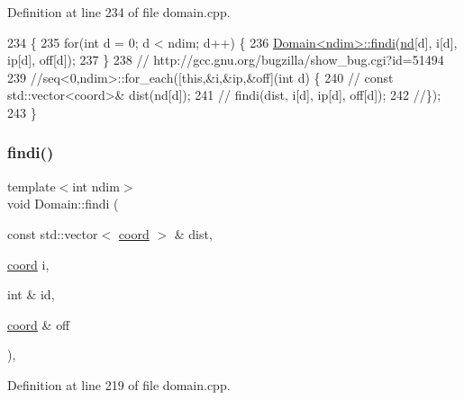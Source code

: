 Definition at line 234 of file domain.\+cpp.


\begin{DoxyCode}
234                                                                             \{
235     \textcolor{keywordflow}{for}(\textcolor{keywordtype}{int} d = 0; d < ndim; d++) \{
236         \hyperlink{classshark_1_1ndim_1_1_domain_a54d58b320fe6d558735b60753f30f7f4}{Domain<ndim>::findi}(\hyperlink{classshark_1_1ndim_1_1_domain_a4964336cc4ccdb2bfcc616fdcbb9a570}{nd}[d], i[d], ip[d], off[d]);
237     \}
238     \textcolor{comment}{// http://gcc.gnu.org/bugzilla/show\_bug.cgi?id=51494}
239     \textcolor{comment}{//seq<0,ndim>::for\_each([this,&i,&ip,&off](int d) \{}
240     \textcolor{comment}{//  const std::vector<coord>& dist(nd[d]);}
241     \textcolor{comment}{//  findi(dist, i[d], ip[d], off[d]);}
242     \textcolor{comment}{//\});}
243 \}
\end{DoxyCode}
\hypertarget{classshark_1_1ndim_1_1_domain_a54d58b320fe6d558735b60753f30f7f4}{}\label{classshark_1_1ndim_1_1_domain_a54d58b320fe6d558735b60753f30f7f4} 
\subsubsection{\texorpdfstring{findi()}{findi()}}
{\footnotesize\ttfamily template$<$int ndim$>$ \\
void Domain\+::findi (\begin{DoxyParamCaption}\item[{const std\+::vector$<$ \hyperlink{namespaceshark_a767a92d5dd82cb82266473bff42fa6d9}{coord} $>$ \&}]{dist,  }\item[{\hyperlink{namespaceshark_a767a92d5dd82cb82266473bff42fa6d9}{coord}}]{i,  }\item[{int \&}]{id,  }\item[{\hyperlink{namespaceshark_a767a92d5dd82cb82266473bff42fa6d9}{coord} \&}]{off }\end{DoxyParamCaption})\hspace{0.3cm}{\ttfamily [static]}, {\ttfamily [private]}}



Definition at line 219 of file domain.\+cpp.


